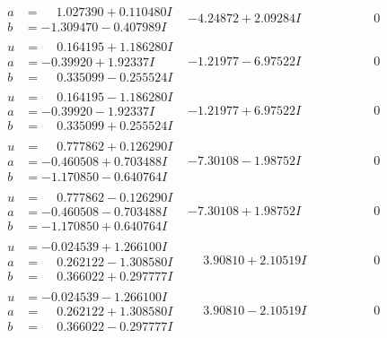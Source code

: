 \documentclass[1p]{elsarticle_modified}
\theoremstyle{definition}
\begin{document}
$$\begin{array}{c|c|c}
\begin{aligned}
a &= \phantom{-}1.027390 + 0.110480 I \\
b &= -1.309470 - 0.407989 I\end{aligned}
 & -4.24872 + 2.09284 I & \phantom{-0.000000 } 0 \\ \hline\begin{aligned}
u &= \phantom{-}0.164195 + 1.186280 I \\
a &= -0.39920 + 1.92337 I \\
b &= \phantom{-}0.335099 - 0.255524 I\end{aligned}
 & -1.21977 - 6.97522 I & \phantom{-0.000000 } 0 \\ \hline\begin{aligned}
u &= \phantom{-}0.164195 - 1.186280 I \\
a &= -0.39920 - 1.92337 I \\
b &= \phantom{-}0.335099 + 0.255524 I\end{aligned}
 & -1.21977 + 6.97522 I & \phantom{-0.000000 } 0 \\ \hline\begin{aligned}
u &= \phantom{-}0.777862 + 0.126290 I \\
a &= -0.460508 + 0.703488 I \\
b &= -1.170850 - 0.640764 I\end{aligned}
 & -7.30108 - 1.98752 I & \phantom{-0.000000 } 0 \\ \hline\begin{aligned}
u &= \phantom{-}0.777862 - 0.126290 I \\
a &= -0.460508 - 0.703488 I \\
b &= -1.170850 + 0.640764 I\end{aligned}
 & -7.30108 + 1.98752 I & \phantom{-0.000000 } 0 \\ \hline\begin{aligned}
u &= -0.024539 + 1.266100 I \\
a &= \phantom{-}0.262122 - 1.308580 I \\
b &= \phantom{-}0.366022 + 0.297777 I\end{aligned}
 & \phantom{-}3.90810 + 2.10519 I & \phantom{-0.000000 } 0 \\ \hline\begin{aligned}
u &= -0.024539 - 1.266100 I \\
a &= \phantom{-}0.262122 + 1.308580 I \\
b &= \phantom{-}0.366022 - 0.297777 I\end{aligned}
 & \phantom{-}3.90810 - 2.10519 I & \phantom{-0.000000 } 0 \\ \hline\begin{aligned}

\end{aligned}
\end{array}$$
\end{document}

